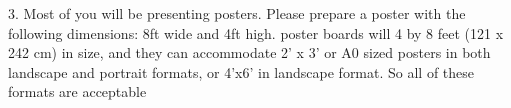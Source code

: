  3. Most of you will be presenting posters. Please prepare a poster with the following dimensions: 8ft wide and 4ft high.
 poster boards will 4 by 8 feet (121 x 242 cm) in size, and they can
 accommodate 2’ x 3’ or A0 sized posters in both landscape and portrait
 formats, or 4’x6’ in landscape format.  So all of these formats are acceptable
